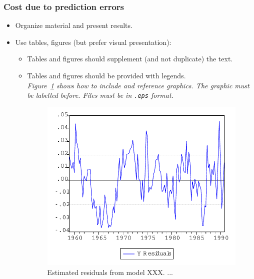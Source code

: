 \subsubsection{Cost due to prediction errors}




\begin{itemize}

    \item Organize material and present results.

    \item Use tables, figures (but prefer visual presentation):
        \begin{itemize}
            \item Tables and figures should supplement (and not duplicate) the
                text.

            \item Tables and figures should be provided with
            legends.\\
                {\it Figure~\ref{Fig:Resids} shows how to include and reference
                graphics. The graphic must be labelled before. Files must be in
                \texttt{.eps} format.}

                \begin{figure}[ht]
                \begin{center}
                    \includegraphics[scale=0.5,angle=0]{thesis/figures/graph.pdf}
                    \caption{Estimated residuals from model XXX. ...}
                    \label{Fig:Resids}
                \end{center}
                \end{figure}


\end{itemize}
\end{itemize}
